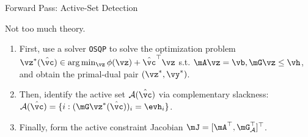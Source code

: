 \documentclass[10pt,aspectratio=169,xcolor=dvipsnames]{beamer}
\begin{document}
\begin{frame}{Forward Pass: Active-Set Detection}

    Not too much theory.

    \begin{enumerate}
        \item First, use a solver \texttt{OSQP} to solve the optimization problem $\vz^*(\hat{\vc}) \in \arg\min_{\vz} \phi(\vz) + \hat{\vc}^\top \vz$ s.t. $\mA \vz = \vb, \mG \vz \leq \vh$, and obtain the primal-dual pair $(\vz^*,\vy^*)$.
        \item Then, identify the active set $\mathcal{A}(\hat{\vc})$ via complementary slackness: $\mathcal{A}(\hat{\vc}) = \{i : (\mG \vz^*(\hat{\vc}))_i = \evh_i\}$.
        \item Finally, form the active constraint Jacobian $\mJ = [\mA^\top , \mG_{\mathcal{A}}^\top]^\top$.

    \end{enumerate}

\end{frame}
\end{document}
